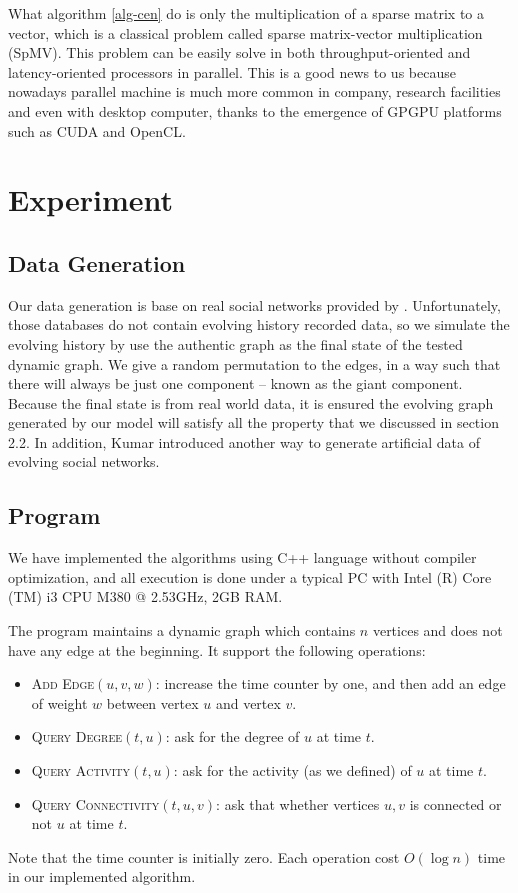 \documentclass[12pt,abstract=true]{scrartcl}
\numberwithin{equation}{section}
\theoremstyle{definition}   \newtheorem{definition}{Definition}[section]
\theoremstyle{plain}        \newtheorem{theorem}{Theorem}[section]
\theoremstyle{plain}        \newtheorem{observation}{Observation}[section]
\theoremstyle{plain}        \newtheorem{fact}{Fact}[section]
\theoremstyle{plain}        \newtheorem{claim}{Claim}[section]
\theoremstyle{plain}        \newtheorem{lemma}[theorem]{Lemma}
\theoremstyle{plain}        \newtheorem{corollary}[theorem]{Corollary}
\theoremstyle{remark}       \newtheorem{example}{Example}[section]
\theoremstyle{remark}       \newtheorem{remark}{Remark}[section]
\begin{document}
What algorithm \ref{alg-cen} do is only the multiplication of a sparse matrix
to a vector, which is a classical problem called sparse matrix-vector
multiplication (SpMV). This problem can be easily solve in both
throughput-oriented and latency-oriented processors in
parallel\cite{williams2009optimization, bell2008efficient,
bell2009implementing, catalyurek1999hypergraph, zhuo2005sparse}.  This is a
good news to us because nowadays parallel machine is much more common in
company, research facilities and even with desktop computer, thanks to the
emergence of GPGPU platforms such as CUDA and OpenCL.

\section{Experiment}
\subsection{Data Generation} 
Our data generation is base on real social networks provided by \cite{database1,
database2}. Unfortunately, those databases do not contain evolving history
recorded data, so we simulate the evolving history by use the
authentic graph as the final state of the tested dynamic graph.
We give a random permutation to the edges, in a way such that there will always
be just one component -- known as the giant component. Because the final state
is from real world data, it is ensured 
the evolving graph generated by our model will satisfy all the property that we
discussed in section 2.2. In addition, Kumar introduced another way to generate
artificial data of evolving social networks\cite{kumar2010structure}.

\subsection{Program}
We have implemented the algorithms using C++ language without compiler
optimization, and all execution is done under a typical PC with 
Intel (R) Core (TM) i3 CPU M380  @ 2.53GHz, 2GB RAM.
	
The program maintains a dynamic graph which contains $n$ vertices and does not
have any edge at the beginning.
It support the following operations:
\begin{itemize}
	\item \textsc{Add Edge$(u,v,w)$:} increase the time counter by one, and then add an edge
		of weight $w$ between vertex $u$ and vertex $v$.
	\item \textsc{Query Degree$(t,u)$:} ask for the degree of $u$ at time $t$.
	\item \textsc{Query Activity$(t,u)$:} ask for the activity (as we defined) of $u$ at time $t$.
	\item \textsc{Query Connectivity$(t,u,v)$:} ask that whether vertices $u,v$ is connected or not
		$u$ at time $t$.
\end{itemize}
Note that the time counter is initially zero.
Each operation cost $O(\log n)$ time in our implemented algorithm.
\end{document}
